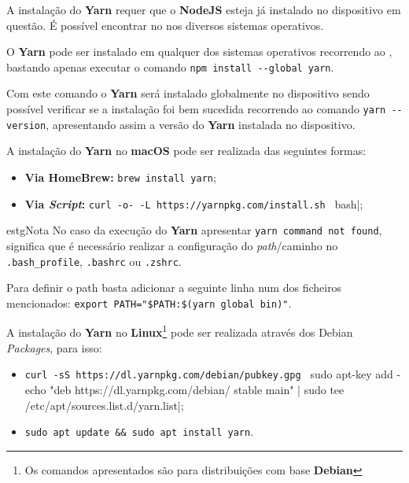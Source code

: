 \label{yarnAttachments}


A instalação do \textbf{Yarn} requer que o \textbf{NodeJS} esteja já instalado no dispositivo em questão. É possível encontrar no  nos diversos sistemas operativos.


O \textbf{Yarn} pode ser instalado em qualquer dos sistemas operativos recorrendo ao \textbf{}, bastando apenas executar o comando \verb|npm install --global yarn|.

Com este comando o \textbf{Yarn} será instalado globalmente no dispositivo sendo possível verificar se a instalação foi bem sucedida recorrendo ao comando \verb|yarn --version|, apresentando assim a versão do \textbf{Yarn} instalada no dispositivo.


A instalação do \textbf{Yarn} no \textbf{macOS} pode ser realizada das seguintes formas:

\begin{itemize}
	\item \textbf{Via HomeBrew:} \verb|brew install yarn|;
	\item \textbf{Via \textit{Script}:} \verb|curl -o- -L https://yarnpkg.com/install.sh | bash|;
\end{itemize}

\begin{mybox}{estg}{Nota}
	No caso da execução do \textbf{Yarn} apresentar \verb|yarn command not found|, significa que é necessário realizar a configuração do \textit{path}/caminho no \verb|.bash_profile|, \verb|.bashrc| ou \verb|.zshrc|.

	\vspace{5pt}

	Para definir o path basta adicionar a seguinte linha num dos ficheiros mencionados: \verb|export PATH="$PATH:$(yarn global bin)"|.
\end{mybox}


A instalação do \textbf{Yarn} no \textbf{Linux}\footnote{Os comandos apresentados são para distribuições com base \textbf{Debian}} pode ser realizada através dos Debian \textit{Packages}, para isso:

\begin{itemize}
	\item \verb|curl -sS https://dl.yarnpkg.com/debian/pubkey.gpg | sudo apt-key add -
echo "deb https://dl.yarnpkg.com/debian/ stable main" | sudo tee /etc/apt/sources.list.d/yarn.list|;
	\item \verb|sudo apt update && sudo apt install yarn|.
\end{itemize}

